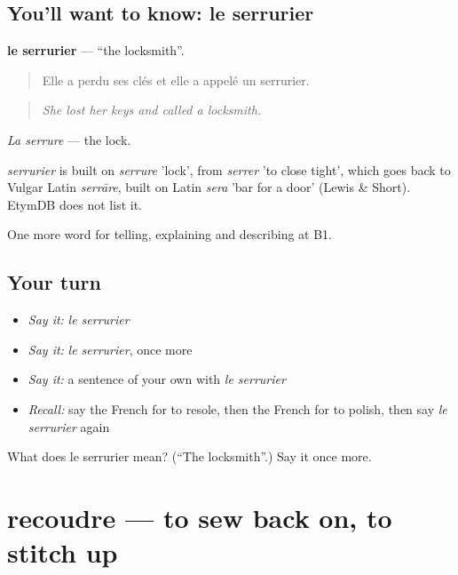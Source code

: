 \subsection*{You'll want to know: le serrurier}
\textbf{le serrurier} — \textquotedblleft{}the locksmith\textquotedblright{}.

\begin{quote}
Elle a perdu ses clés et elle a appelé un serrurier.
\end{quote}

\begin{quote}
\emph{She lost her keys and called a locksmith.}
\end{quote}

\emph{La serrure} — the lock.

\begin{cousinweb}
\emph{serrurier} is built on \emph{serrure} 'lock', from \emph{serrer} 'to close tight', which goes back to Vulgar Latin \emph{serrāre}, built on Latin \emph{sera} 'bar for a door' (Lewis \& Short). EtymDB does not list it.
\end{cousinweb}

\begin{grammarlens}[title={What you've built}]
One more word for telling, explaining and describing at B1.
\end{grammarlens}

\subsection*{Your turn}
\begin{itemize}
\raggedright
  \item \emph{Say it:} \emph{le serrurier}
  \item \emph{Say it:} \emph{le serrurier}, once more
  \item \emph{Say it:} a sentence of your own with \emph{le serrurier}
  \item \emph{Recall:} say the French for to resole, then the French for to polish, then say \emph{le serrurier} again
\end{itemize}

\begin{tcolorbox}[breakable,colback=teal!4,colframe=teal!35!black,title={Before you move on}]
What does le serrurier mean? (\textquotedblleft{}The locksmith\textquotedblright{}.) Say it once more.
\end{tcolorbox}
\section[recoudre]{recoudre — to sew back on, to stitch up}

